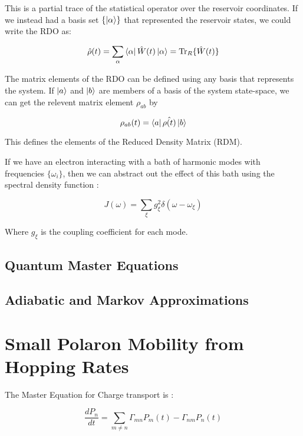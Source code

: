 This is a partial trace of the statistical operator over the reservoir coordinates. If we instead had a basis set $\{\ket{\alpha}\}$ that represented the reservoir states, we could write the RDO as:

\begin{equation}
    \hat{\rho}(t) = \sum_{\alpha} \bra{\alpha}\hat{W}(t)\ket{\alpha} = \Tr_{R}\{\hat{W}(t)\}
\end{equation}

The matrix elements of the RDO can be defined using any basis that represents the system. If $\ket{a}$ and $\ket{b}$ are members of a basis of the system state-space, we can get the relevent matrix element $\rho_{ab}$ by

\begin{equation}
    \rho_{ab}(t) = \bra{a}\hat{\rho(t)}\ket{b}
\end{equation}

This defines the elements of the Reduced Density Matrix (RDM).

If we have an electron interacting with a bath of harmonic modes with frequencies $\{\omega_i\}$, then we can abstract out the effect of this bath using the spectral density function \cite{maykuhn}:

\begin{equation}
    J(\omega) = \sum_{\xi} g_{\xi}^2 \delta(\omega - \omega_{\xi})
\end{equation}

Where $g_{\xi}$ is the coupling coefficient for each mode. 

\subsection{Quantum Master Equations}

\subsection{Adiabatic and Markov Approximations}

\section{Small Polaron Mobility from Hopping Rates}


The Master Equation for Charge transport is :

\begin{equation}
\frac{dP_n}{dt} = \sum_{m \neq n} \Gamma_{mn} P_m(t) - \Gamma_{nm} P_n(t)
\end{equation}

